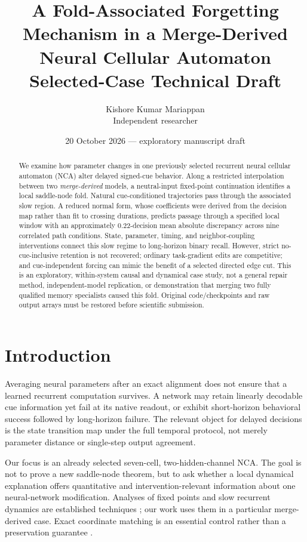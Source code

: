 \documentclass[10pt]{article}
\title{A Fold-Associated Forgetting Mechanism in a Merge-Derived\\ Neural Cellular Automaton\\\large Selected-Case Technical Draft}
\author{Kishore Kumar Mariappan\\\small Independent researcher}
\date{20 October 2026 --- exploratory manuscript draft}
\begin{document}
\maketitle
\begin{abstract}
We examine how parameter changes in one previously selected recurrent neural cellular automaton (NCA) alter delayed signed-cue behavior. Along a restricted interpolation between two \emph{merge-derived} models, a neutral-input fixed-point continuation identifies a local saddle-node fold. Natural cue-conditioned trajectories pass through the associated slow region. A reduced normal form, whose coefficients were derived from the decision map rather than fit to crossing durations, predicts passage through a specified local window with an approximately 0.22-decision mean absolute discrepancy across nine correlated path conditions. State, parameter, timing, and neighbor-coupling interventions connect this slow regime to long-horizon binary recall. However, strict no-cue-inclusive retention is not recovered; ordinary task-gradient edits are competitive; and cue-independent forcing can mimic the benefit of a selected directed edge cut. This is an exploratory, within-system causal and dynamical case study, not a general repair method, independent-model replication, or demonstration that merging two fully qualified memory specialists caused this fold. Original code/checkpoints and raw output arrays must be restored before scientific submission.
\end{abstract}

\section{Introduction}
Averaging neural parameters after an exact alignment does not ensure that a learned recurrent computation survives. A network may retain linearly decodable cue information yet fail at its native readout, or exhibit short-horizon behavioral success followed by long-horizon failure. The relevant object for delayed decisions is the state transition map under the full temporal protocol, not merely parameter distance or single-step output agreement.

Our focus is an already selected seven-cell, two-hidden-channel NCA. The goal is not to prove a new saddle-node theorem, but to ask whether a local dynamical explanation offers quantitative and intervention-relevant information about one neural-network modification. Analyses of fixed points and slow recurrent dynamics are established techniques \cite{sussillo2013,dinc2025}; our work uses them in a particular merge-derived case. Exact coordinate matching is an essential control rather than a preservation guarantee \cite{ainsworth2023}.
\end{document}
